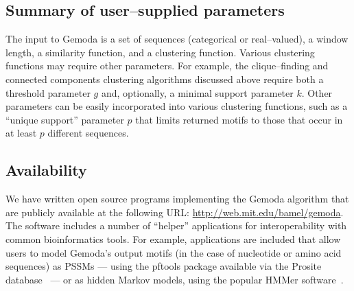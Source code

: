     \subsection{Summary of user--supplied parameters} The
    input to Gemoda is a set of sequences (categorical
    or real--valued), a window length, a similarity
    function, and a clustering function.  Various
    clustering functions may require other parameters.
    For example, the clique--finding and connected components
    clustering algorithms discussed above require
    both a threshold parameter $g$ and, optionally,
    a minimal support parameter $k$.  Other parameters
    can be easily incorporated into various clustering
    functions, such as a ``unique support'' parameter
    $p$ that limits returned motifs to those that
    occur in at least $p$ different sequences.

    \subsection{Availability}
    We have written open source programs
    implementing the Gemoda algorithm that are
    publicly available at the following URL:
    \url{http://web.mit.edu/bamel/gemoda}.
    The software includes a number of ``helper'' applications
    for interoperability with common bioinformatics
    tools.  For example, applications are included
    that allow users to model Gemoda's output motifs
    (in the case of nucleotide or amino acid sequences)
    as PSSMs --- using the pftools package available
    via the Prosite database~\citep{hofmann1999prosite}
    --- or as hidden Markov models, using the popular
    HMMer software~\citep{eddy1998profile}.

